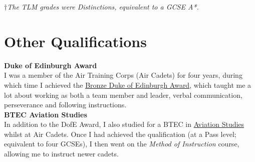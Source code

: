 \documentclass[9pt,a4paper]{article}
\begin{document}
\emph{$\dagger$The TLM grades were Distinctions, equivalent to a GCSE A*.}

\pagebreak
\section{Other Qualifications}
\textbf{Duke of Edinburgh Award}\\
I was a member of the Air Training Corps (Air Cadets) for four years, during which time I achieved the \underline{Bronze Duke of Edinburgh Award}, which taught me a lot about working as both a team member and leader, verbal communication, perseverance and following instructions.\\\linebreak
\textbf{BTEC Aviation Studies}\\
In addition to the DofE Award, I also studied for a BTEC in \underline{Aviation Studies} whilst at Air Cadets. Once I had achieved the qualification (at a Pass level; equivalent to four GCSEs), I then went on the \emph{Method of Instruction} course, allowing me to instruct newer cadets.
\end{document}
